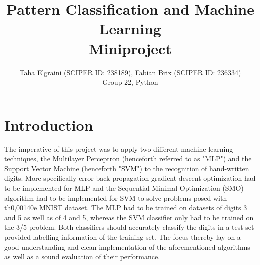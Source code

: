 \documentclass[10pt,a4paper]{article}
\title{Pattern Classification and Machine Learning\\\Huge Miniproject}
\author{Taha Elgraini (SCIPER ID: 238189), Fabian Brix (SCIPER ID: 236334)\\Group 22, Python}
\begin{document}
\maketitle

\section{Introduction}
The imperative of this project was to apply two different machine learning techniques, the Multilayer Perceptron (henceforth referred to as "MLP") and the Support Vector Machine (henceforth "SVM") to the recognition of hand-written digits. More specifically error back-propagation gradient descent optimization had to be implemented for MLP and the Sequential Minimal Optimization (SMO) algorithm had to be implemented for SVM to solve problems posed with th0,00140e MNIST dataset. The MLP had to be trained on datasets of digits 3 and 5 as well as of 4 and 5, whereas the SVM classifier only had to be trained on the 3/5 problem. Both classifiers should accurately classify the digits in a test set provided labelling information of the training set. The focus thereby lay on a good understanding and clean implementation of the aforementioned algorithms as well as a sound evaluation of their performance.


\end{document}
